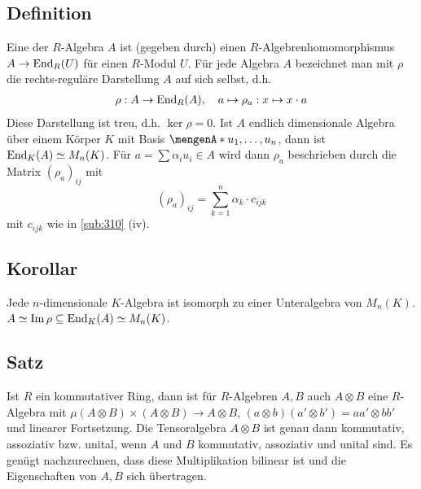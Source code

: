 \subsection[Definition: Darstellung einer $R$-Algebra]{Definition} %
\label{sub:311}
Eine  der $R$-Algebra $A$ ist (gegeben durch) einen $R$-Algebrenhomomorphismus $A \to \operatorname{End}_R(U)$ für einen $R$-Modul $U$.
Für jede Algebra $A$ bezeichnet man mit $\rho$ die rechts-reguläre Darstellung $A$ auf sich selbst, d.h. 
\begin{align*}
	\rho : A \to \operatorname{End}_R(A), \quad a \mapsto \rho_a : x \mapsto x \cdot a 
\end{align*}
Diese Darstellung ist treu, d.h. $\ker \rho = 0$. Ist $A$ endlich dimensionale Algebra über einem Körper $K$ mit Basis $\set{u_1, \ldots , u_n}$, dann ist 
$\operatorname{End}_K(A) \simeq M_n(K)$. Für $a = \sum \alpha_i u_i \in A$ wird dann $\rho_a$ beschrieben durch die Matrix $(\rho_a)_{ij}$ mit 
\[
	(\rho_a)_{ij} = \sum_{k=1}^{n} \alpha_k \cdot c_{ijk}
\]
mit $c_{ijk}$ wie in \ref{sub:310} (iv).

\subsection[Korollar: Jede $n$-dimensionale $K$-Algebra ist isomorph zu Unteralgebra von $M_n(K)$]{Korollar} %
\label{sub:312}
Jede $n$-dimensionale $K$-Algebra ist isomorph zu einer Unteralgebra von $M_n(K)$.
$A \simeq \operatorname{Im} \rho \subseteq \operatorname{End}_K(A) \simeq M_n(K)$. \bewende

\subsection[Satz: Tensorprodukt von Algebren ist eine Algebra]{Satz} %
\label{sub:313}
Ist $R$ ein kommutativer Ring, dann ist für $R$-Algebren $A,B$ auch $A \otimes B$ eine $R$-Algebra mit $\mu (A \otimes B) \times (A \otimes B) \to A \otimes B$,
$(a \otimes b)(a' \otimes b') = a a' \otimes  b b'$ und linearer Fortsetzung. Die Tensoralgebra  $A \otimes B$ ist genau dann kommutativ, assoziativ bzw. unital, wenn $A$
und $B$ kommutativ, assoziativ und unital sind.
Es genügt nachzurechnen, dass diese Multiplikation bilinear ist und die Eigenschaften  von $A,B$ sich übertragen. \bewende

